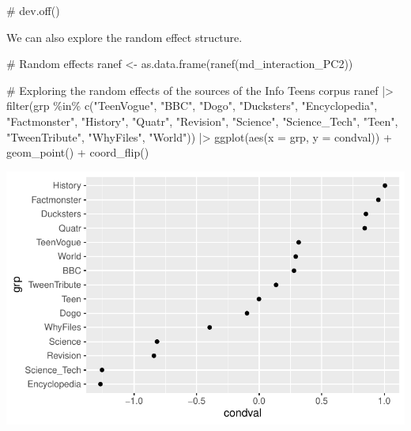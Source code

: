 \documentclass[
  letterpaper,
  DIV=11,
  numbers=noendperiod]{scrreprt}
\newenvironment{Shaded}{\begin{snugshade}}{\end{snugshade}}
\newcommand{\AttributeTok}[1]{\textcolor[rgb]{0.40,0.45,0.13}{#1}}
\newcommand{\CommentTok}[1]{\textcolor[rgb]{0.37,0.37,0.37}{#1}}
\newcommand{\FunctionTok}[1]{\textcolor[rgb]{0.28,0.35,0.67}{#1}}
\newcommand{\NormalTok}[1]{\textcolor[rgb]{0.00,0.23,0.31}{#1}}
\newcommand{\OtherTok}[1]{\textcolor[rgb]{0.00,0.23,0.31}{#1}}
\newcommand{\SpecialCharTok}[1]{\textcolor[rgb]{0.37,0.37,0.37}{#1}}
\newcommand{\StringTok}[1]{\textcolor[rgb]{0.13,0.47,0.30}{#1}}
\begin{document}
\begin{Shaded}
\begin{Highlighting}[]
\CommentTok{\# dev.off()}
\end{Highlighting}
\end{Shaded}

We can also explore the random effect structure.

\begin{Shaded}
\begin{Highlighting}[]
\CommentTok{\# Random effects}
\NormalTok{ranef }\OtherTok{\textless{}{-}} \FunctionTok{as.data.frame}\NormalTok{(}\FunctionTok{ranef}\NormalTok{(md\_interaction\_PC2))}

\CommentTok{\# Exploring the random effects of the sources of the Info Teens corpus}
\NormalTok{ranef }\SpecialCharTok{|\textgreater{}} 
  \FunctionTok{filter}\NormalTok{(grp }\SpecialCharTok{\%in\%} \FunctionTok{c}\NormalTok{(}\StringTok{"TeenVogue"}\NormalTok{, }\StringTok{"BBC"}\NormalTok{, }\StringTok{"Dogo"}\NormalTok{, }\StringTok{"Ducksters"}\NormalTok{, }\StringTok{"Encyclopedia"}\NormalTok{, }\StringTok{"Factmonster"}\NormalTok{, }\StringTok{"History"}\NormalTok{, }\StringTok{"Quatr"}\NormalTok{, }\StringTok{"Revision"}\NormalTok{, }\StringTok{"Science"}\NormalTok{, }\StringTok{"Science\_Tech"}\NormalTok{, }\StringTok{"Teen"}\NormalTok{, }\StringTok{"TweenTribute"}\NormalTok{, }\StringTok{"WhyFiles"}\NormalTok{, }\StringTok{"World"}\NormalTok{)) }\SpecialCharTok{|\textgreater{}} 
  \FunctionTok{ggplot}\NormalTok{(}\FunctionTok{aes}\NormalTok{(}\AttributeTok{x =}\NormalTok{ grp, }\AttributeTok{y =}\NormalTok{ condval)) }\SpecialCharTok{+}
  \FunctionTok{geom\_point}\NormalTok{() }\SpecialCharTok{+}
  \FunctionTok{coord\_flip}\NormalTok{()}
\end{Highlighting}
\end{Shaded}

\includegraphics{AppendixH_files/figure-pdf/unnamed-chunk-14-1.pdf}
\end{document}
